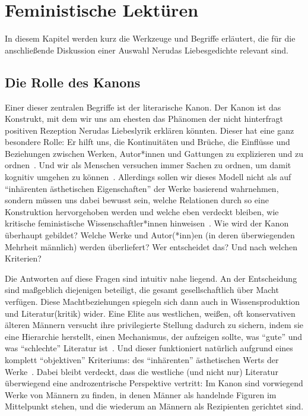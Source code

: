 \section{Feministische Lektüren}

In diesem Kapitel werden kurz die Werkzeuge und Begriffe erläutert, die für die anschließende Diskussion einer Auswahl Nerudas Liebesgedichte relevant sind.

\subsection{Die Rolle des Kanons}
\label{chap:canon}

Einer dieser zentralen Begriffe ist der literarische Kanon.
Der Kanon ist das Konstrukt, mit dem wir uns am ehesten das Phänomen der nicht hinterfragt positiven Rezeption Nerudas Liebeslyrik erklären könnten.
Dieser hat eine ganz besondere Rolle:
Er hilft uns, die Kontinuitäten und Brüche, die Einflüsse und Beziehungen zwischen Werken, Autor*innen und Gattungen zu explizieren und zu ordnen~\cite{Kolodny1980}.
Und wir als Menschen versuchen immer Sachen zu ordnen, um damit kognitiv umgehen zu können~\cite{JorRus1999}.
Allerdings sollen wir dieses Modell nicht als auf ``inhärenten ästhetischen Eigenschaften'' der Werke basierend wahrnehmen, sondern müssen uns dabei bewusst sein, welche Relationen durch so eine Konstruktion hervorgehoben werden und welche eben verdeckt bleiben, wie kritische feministische Wissenschaftler*innen hinweisen~\cite{Kolodny1980}.
Wie wird der Kanon überhaupt gebildet?
Welche Werke und Autor(*inn)en (in deren überwiegenden Mehrheit männlich) werden überliefert?
Wer entscheidet das?
Und nach welchen Kriterien?

Die Antworten auf diese Fragen sind intuitiv nahe liegend.
An der Entscheidung sind maßgeblich diejenigen beteiligt, die gesamt gesellschaftlich über Macht verfügen.
Diese Machtbeziehungen spiegeln sich dann auch in Wissensproduktion und Literatur(kritik) wider.
Eine Elite aus westlichen, weißen, oft konservativen älteren Männern versucht ihre privilegierte Stellung dadurch zu sichern, indem sie eine Hierarchie herstellt, einen Mechanismus, der aufzeigen sollte, was ``gute'' und was ``schlechte'' Literatur ist~\cite{North2013}.
Und dieser funktioniert natürlich aufgrund eines komplett ``objektiven'' Kriteriums: des ``inhärenten'' ästhetischen Werts der Werke~\cite{Kolodny1980}.
Dabei bleibt verdeckt, dass die westliche (und nicht nur) Literatur überwiegend eine androzentrische Perspektive vertritt:
Im Kanon sind vorwiegend Werke von Männern zu finden, in denen Männer als handelnde Figuren im Mittelpunkt stehen, und die wiederum an Männern als Rezipienten gerichtet sind.

